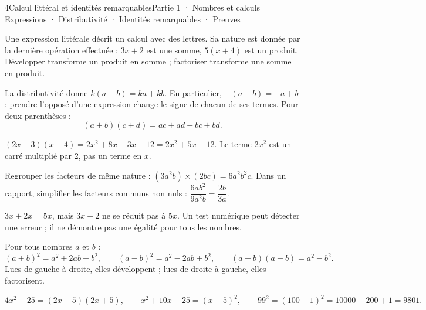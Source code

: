 \begin{ouverture}[courbe]{4}{Calcul littéral et identités remarquables}{Partie 1 · Nombres et calculs}
{Expressions · Distributivité · Identités remarquables · Preuves}
\end{ouverture}
\pagestyle{otMain}\essentiel\fontsize{11}{15}\selectfont
{}
\begin{definition}Une expression littérale décrit un calcul avec des lettres. Sa nature est donnée par la dernière opération effectuée : $3x+2$ est une somme, $5(x+4)$ est un produit. Développer transforme un produit en somme ; factoriser transforme une somme en produit.\end{definition}
\begin{propriete}La distributivité donne $k(a+b)=ka+kb$. En particulier, $-(a-b)=-a+b$ : prendre l’opposé d’une expression change le signe de chacun de ses termes. Pour deux parenthèses :
\[(a+b)(c+d)=ac+ad+bc+bd.\]\end{propriete}
\begin{exemple}$(2x-3)(x+4)=2x^2+8x-3x-12=2x^2+5x-12$. Le terme $2x^2$ est un carré multiplié par 2, pas un terme en $x$.\end{exemple}
\begin{savoirfaire}Regrouper les facteurs de même nature : $(3a^2b)\times(2bc)=6a^2b^2c$. Dans un rapport, simplifier les facteurs communs non nuls : $\dfrac{6ab^2}{9a^2b}=\dfrac{2b}{3a}$.\end{savoirfaire}
\begin{attention}$3x+2x=5x$, mais $3x+2$ ne se réduit pas à $5x$. Un test numérique peut détecter une erreur ; il ne démontre pas une égalité pour tous les nombres.\end{attention}
\clearpage
{}
\begin{propriete}Pour tous nombres $a$ et $b$ :
\[(a+b)^2=a^2+2ab+b^2,\qquad (a-b)^2=a^2-2ab+b^2,\qquad (a-b)(a+b)=a^2-b^2.\]
Lues de gauche à droite, elles développent ; lues de droite à gauche, elles factorisent.\end{propriete}
\begin{exemple}
\[4x^2-25=(2x-5)(2x+5),\qquad x^2+10x+25=(x+5)^2,\qquad 99^2=(100-1)^2=10000-200+1=9801.\]
\end{exemple}
